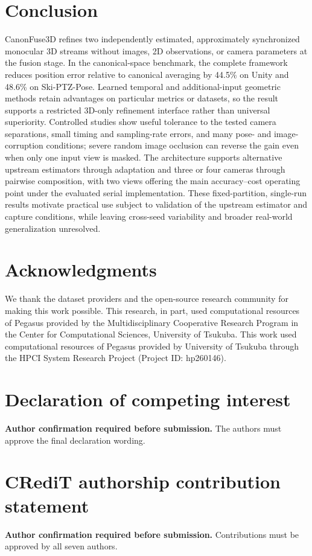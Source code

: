 \documentclass[preprint,12pt]{elsarticle}
\begin{document}
\section{Conclusion}
\label{sec:conclusion}

CanonFuse3D refines two independently estimated, approximately synchronized monocular 3D streams without images, 2D observations, or camera parameters at the fusion stage. In the canonical-space benchmark, the complete framework reduces position error relative to canonical averaging by 44.5\% on Unity and 48.6\% on Ski-PTZ-Pose. Learned temporal and additional-input geometric methods retain advantages on particular metrics or datasets, so the result supports a restricted 3D-only refinement interface rather than universal superiority. Controlled studies show useful tolerance to the tested camera separations, small timing and sampling-rate errors, and many pose- and image-corruption conditions; severe random image occlusion can reverse the gain even when only one input view is masked. The architecture supports alternative upstream estimators through adaptation and three or four cameras through pairwise composition, with two views offering the main accuracy--cost operating point under the evaluated serial implementation. These fixed-partition, single-run results motivate practical use subject to validation of the upstream estimator and capture conditions, while leaving cross-seed variability and broader real-world generalization unresolved.

\section*{Acknowledgments}
We thank the dataset providers and the open-source research community for making this work possible. This research, in part, used computational resources of Pegasus provided by the Multidisciplinary Cooperative Research Program in the Center for Computational Sciences, University of Tsukuba. This work used computational resources of Pegasus provided by University of Tsukuba through the HPCI System Research Project (Project ID: hp260146).

\section*{Declaration of competing interest}
\textbf{Author confirmation required before submission.} The authors must approve the final declaration wording.

\section*{CRediT authorship contribution statement}
\textbf{Author confirmation required before submission.} Contributions must be approved by all seven authors.
\end{document}
